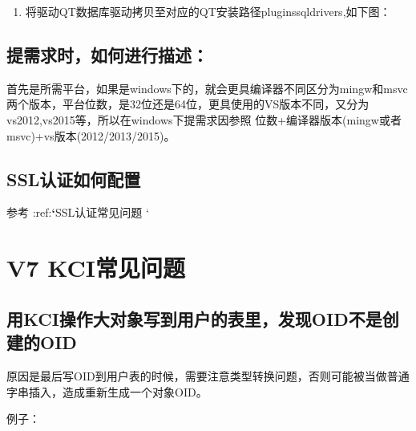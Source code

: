\documentclass[letterpaper,10pt,english]{sphinxmanual}
\begin{document}
\begin{figure}[htbp]
\centering

\noindent{}
\end{figure}
\begin{enumerate}
%
\setcounter{enumi}{1}
\item {} 
将驱动QT数据库驱动拷贝至对应的QT安装路径pluginssqldrivers,如下图：

\end{enumerate}

\begin{figure}[htbp]
\centering

\noindent{}
\end{figure}


\subsection{提需求时，如何进行描述：}
\label{\detokenize{interface/qt:id1}}
首先是所需平台，如果是windows下的，就会更具编译器不同区分为mingw和msvc两个版本，平台位数，是32位还是64位，更具使用的VS版本不同，又分为vs2012,vs2015等，所以在windows下提需求因参照 位数+编译器版本(mingw或者msvc)+vs版本(2012/2013/2015)。


\subsection{SSL认证如何配置}
\label{\detokenize{interface/qt:ssl}}
参考 :ref:{\color{red}\bfseries{}`}SSL认证常见问题 `


\section{V7 KCI常见问题}
\label{\detokenize{interface/kci-v7:v7-kci}}\label{\detokenize{interface/kci-v7::doc}}

\subsection{用KCI操作大对象写到用户的表里，发现OID不是创建的OID}
\label{\detokenize{interface/kci-v7:kci-oidoid}}
原因是最后写OID到用户表的时候，需要注意类型转换问题，否则可能被当做普通字串插入，造成重新生成一个对象OID。

例子：

\begin{sphinxVerbatim}[commandchars=\\\{\}]
   
                      
\end{sphinxVerbatim}
\end{document}
